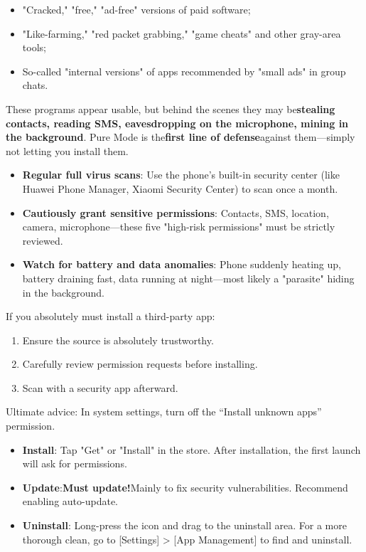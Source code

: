 \begin{itemize}
  \item "Cracked," "free," "ad-free" versions of paid software;
  \item "Like-farming," "red packet grabbing," "game cheats" and other gray-area tools;
  \item So-called "internal versions" of apps recommended by "small ads" in group chats.
\end{itemize}

These programs appear usable, but behind the scenes they may be\textbf{stealing contacts, reading SMS, eavesdropping on the microphone, mining in the background}. Pure Mode is the\textbf{first line of defense}against them—simply not letting you install them.


\begin{itemize}
  \item \textbf{Regular full virus scans}: Use the phone's built-in security center (like Huawei Phone Manager, Xiaomi Security Center) to scan once a month.
  \item \textbf{Cautiously grant sensitive permissions}: Contacts, SMS, location, camera, microphone—these five "high-risk permissions" must be strictly reviewed.
  \item \textbf{Watch for battery and data anomalies}: Phone suddenly heating up, battery draining fast, data running at night—most likely a "parasite" hiding in the background.
\end{itemize}

If you absolutely must install a third-party app:

\begin{enumerate}
  \item Ensure the source is absolutely trustworthy.
  \item Carefully review permission requests before installing.
  \item Scan with a security app afterward.
\end{enumerate}

Ultimate advice: In system settings, turn off the “Install unknown apps” permission.


\begin{itemize}
  \item \textbf{Install}: Tap "Get" or "Install" in the store. After installation, the first launch will ask for permissions.
  \item \textbf{Update}:\textbf{Must update!}Mainly to fix security vulnerabilities. Recommend enabling auto-update.
  \item \textbf{Uninstall}: Long-press the icon and drag to the uninstall area. For a more thorough clean, go to [Settings] > [App Management] to find and uninstall.
\end{itemize}

